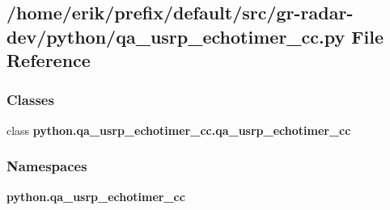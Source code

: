 \subsection{/home/erik/prefix/default/src/gr-\/radar-\/dev/python/qa\+\_\+usrp\+\_\+echotimer\+\_\+cc.py File Reference}
\label{qa__usrp__echotimer__cc_8py}
\subsubsection*{Classes}
\begin{DoxyCompactItemize}
\item 
class {\bf python.\+qa\+\_\+usrp\+\_\+echotimer\+\_\+cc.\+qa\+\_\+usrp\+\_\+echotimer\+\_\+cc}
\end{DoxyCompactItemize}
\subsubsection*{Namespaces}
\begin{DoxyCompactItemize}
\item 
 {\bf python.\+qa\+\_\+usrp\+\_\+echotimer\+\_\+cc}
\end{DoxyCompactItemize}
